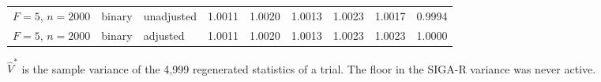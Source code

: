 \begin{table}[!htbp]
\begin{threeparttable}
\begin{singlespace}
\begin{tabular}{@{}lllllllll@{}}
$F=5$, $n=2000$ & binary & unadjusted & 1.0011 & 1.0020 & 1.0013 & 1.0023 & 1.0017 & 0.9994\\
$F=5$, $n=2000$ & binary & adjusted & 1.0011 & 1.0020 & 1.0013 & 1.0023 & 1.0023 & 1.0000\\
\bottomrule\end{tabular}
\begin{tablenotes}[flushleft]\small\item $\widehat V^{*}$ is the sample variance of the 4,999 regenerated statistics of a trial. The floor in the SIGA-R variance was never active.\end{tablenotes}
\end{singlespace}\end{threeparttable}\end{table}
